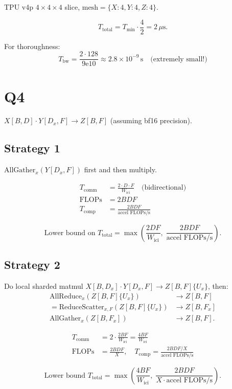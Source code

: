 \documentclass[11pt]{article}
\newcommand{\flops}{\text{FLOPs}}
\newcommand{\flopss}{\text{FLOPs/s}}
\newcommand{\Tcomm}{T_{\text{comm}}}
\newcommand{\Tcomp}{T_{\text{comp}}}
\newcommand{\Ttotal}{T_{\text{total}}}
\newcommand{\Tmin}{T_{\min}}
\newcommand{\Wici}{W_{\text{ici}}}
\begin{document}
TPU v4p $4 \times 4 \times 4$ slice, $\text{mesh} = \{X{:}4, Y{:}4, Z{:}4\}$.

\[
\Ttotal = \Tmin \cdot \frac{4}{2} = 2\,\mu\text{s}.
\]

For thoroughness:
\[
T_{\text{bw}} = \frac{2 \cdot 128}{9\mathrm{e}10} \approx 2.8 \times 10^{-9}\,\text{s} \quad \text{(extremely small!)}
\]

\section*{Q4}

$X[B, D] \cdot Y[D_x, F] \to Z[B, F]$ \quad (assuming bf16 precision).

\subsection*{Strategy 1}

$\text{AllGather}_x(Y[D_x, F])$ first and then multiply.

\begin{align*}
\Tcomm &= \frac{2 \cdot D \cdot F}{\Wici} \quad \text{(bidirectional)} \\
\flops &= 2BDF \\
\Tcomp &= \frac{2BDF}{\text{accel }\flopss}
\end{align*}

\[
\text{Lower bound on } \Ttotal = \max\!\left(\frac{2DF}{\Wici},\; \frac{2BDF}{\text{accel }\flopss}\right).
\]

\subsection*{Strategy 2}

Do local sharded matmul $X[B, D_x] \cdot Y[D_x, F] \to Z[B, F]\{U_x\}$, then:
\begin{align*}
\text{AllReduce}_x(Z[B, F]\{U_x\}) &\to Z[B, F] \\
= \text{ReduceScatter}_{x, F}(Z[B, F]\{U_x\}) &\to Z[B, F_x] \\
\text{AllGather}_x(Z[B, F_x]) &\to Z[B, F].
\end{align*}

\begin{align*}
\Tcomm &= 2 \cdot \frac{2BF}{\Wici} = \frac{4BF}{\Wici} \\
\flops &= \frac{2BDF}{X},\quad \Tcomp = \frac{2BDF / X}{\text{accel }\flopss}
\end{align*}

\[
\text{Lower bound } \Ttotal = \max\!\left(\frac{4BF}{\Wici},\; \frac{2BDF}{X \cdot \text{accel }\flopss}\right).
\]
\end{document}
